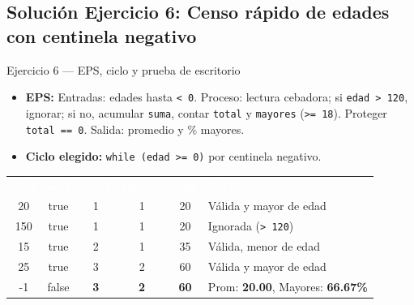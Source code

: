 \documentclass[11pt,letterpaper]{article}
\begin{document}
\subsection{Solución Ejercicio 6: Censo rápido de edades con centinela negativo}

\begin{solucion}{Ejercicio 6 --- EPS, ciclo y prueba de escritorio}
\begin{itemize}
  \item \textbf{EPS:} Entradas: edades hasta \texttt{< 0}. Proceso: lectura cebadora; si \texttt{edad > 120}, ignorar; si no, acumular \texttt{suma}, contar \texttt{total} y \texttt{mayores} (\texttt{>= 18}). Proteger \texttt{total == 0}. Salida: promedio y \% mayores.
  \item \textbf{Ciclo elegido:} \texttt{while (edad >= 0)} por centinela negativo.
\end{itemize}
\begin{center}
\footnotesize
\renewcommand{\arraystretch}{1.15}
\begin{tabularx}{0.9\linewidth}{c c c c c X}
\rowcolor{AzulMarino}
\textcolor{white}{\texttt{edad}} & \textcolor{white}{\texttt{>= 0}} & \textcolor{white}{\texttt{total}} & \textcolor{white}{\texttt{mayores}} & \textcolor{white}{\texttt{suma}} & \textcolor{white}{\textbf{Acción}} \\
20 & true & 1 & 1 & 20 & Válida y mayor de edad \\
150 & true & 1 & 1 & 20 & Ignorada (\texttt{> 120}) \\
15 & true & 2 & 1 & 35 & Válida, menor de edad \\
25 & true & 3 & 2 & 60 & Válida y mayor de edad \\
-1 & false & \textbf{3} & \textbf{2} & \textbf{60} & Prom: \textbf{20.00}, Mayores: \textbf{66.67\%} \\
\bottomrule
\end{tabularx}
\end{center}
\end{solucion}
\end{document}
